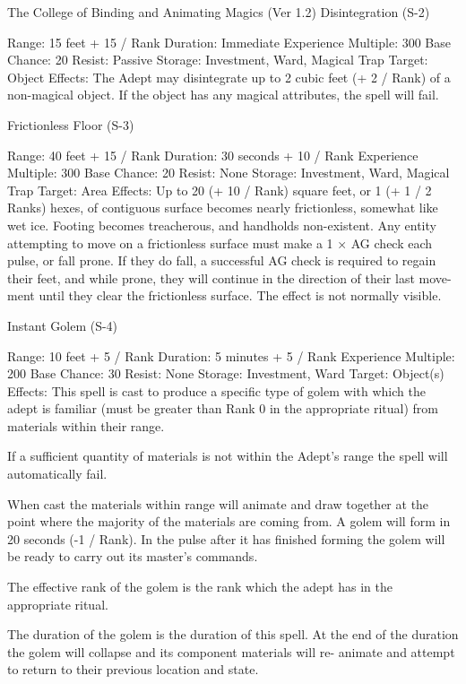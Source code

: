 \begin{Chapter}{The College of Binding and Animating Magics (Ver 1.2)}
Disintegration (S-2) 

Range: 15 feet + 15 / Rank 
Duration: Immediate 
Experience Multiple: 300 
Base Chance: 20%
Resist: Passive 
Storage: Investment, Ward, Magical Trap 
Target: Object 
Effects:  The  Adept  may  disintegrate  up to  2  cubic 
feet  (+  2  /  Rank)  of  a  non-magical  object.  If  the 
object has any magical attributes, the spell will fail. 

Frictionless Floor (S-3) 

Range: 40 feet + 15 / Rank 
Duration: 30 seconds + 10 / Rank 
Experience Multiple: 300 
Base Chance: 20%
Resist: None 
Storage: Investment, Ward, Magical Trap 
Target: Area 
Effects: Up to 20 (+ 10 / Rank) square feet, or 1 (+ 
1 / 2 Ranks) hexes, of contiguous surface becomes 
nearly frictionless, somewhat like wet ice. Footing 
becomes  treacherous,  and  handholds  non-existent. 
Any  entity  attempting  to  move  on  a  frictionless 
surface must make a 1 × AG check each pulse, or 
fall prone. If they do fall, a successful AG check is 
required to regain their feet, and while prone, they 
will  continue  in  the  direction  of  their  last  move-
ment  until  they  clear  the  frictionless  surface.  The 
effect is not normally visible. 

Instant Golem (S-4) 

Range: 10 feet + 5 / Rank 
Duration: 5 minutes + 5 / Rank 
Experience Multiple: 200 
Base Chance: 30%
Resist: None 
Storage: Investment, Ward 
Target: Object(s) 
Effects: This spell is cast to produce a specific type 
of golem with which the adept is familiar (must be 
greater than Rank 0 in the appropriate ritual) from 
materials within their range. 

If a sufficient quantity of materials is not within the 
Adept’s range the spell will automatically fail. 

When cast the materials within range will animate 
and  draw  together  at  the  point  where  the  majority 
of  the  materials  are  coming  from.  A  golem  will 
form in 20 seconds (-1 / Rank). In the pulse after it 
has  finished  forming  the  golem  will  be  ready  to 
carry out its master’s commands. 

The  effective  rank  of  the  golem  is  the  rank  which 
the adept has in the appropriate ritual. 

The  duration  of  the  golem  is  the  duration  of  this 
spell.  At  the  end  of  the  duration  the  golem  will 
collapse  and  its  component  materials  will  re-
animate  and  attempt  to  return  to  their  previous 
location and state. 


\end{Chapter}
